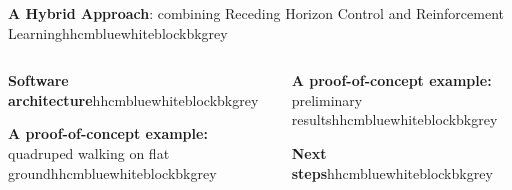 \documentclass{beamer}
\begin{document}
	
	\begin{frame}[t]
		
			
		\begin{columns}[b]
			
			\begin{column}{0.955\textwidth}
				
				\begin{customblock}{\textbf{A Hybrid Approach}: combining Receding Horizon Control and Reinforcement Learning}{hhcmblue}{white}{blockbkgrey}
					
					
					
				\end{customblock}
		
			\end{column}
		
		\end{columns}
			
		\begin{columns}[T] 

			\begin{column}{.46\textwidth}
				
				\begin{customblock}{\textbf{Software architecture}}{hhcmblue}{white}{blockbkgrey}
					
				\end{customblock}
				\begin{customblock}{\textbf{A proof-of-concept example:} quadruped walking on flat ground}{hhcmblue}{white}{blockbkgrey}
					
				\end{customblock}
				
			\end{column}
			
			\begin{column}{.46\textwidth}
			
				\begin{customblock}{\textbf{A proof-of-concept example: } preliminary results}{hhcmblue}{white}{blockbkgrey}
					
				\end{customblock}
			
				
				\begin{customblock}{\textbf{Next steps}}{hhcmblue}{white}{blockbkgrey}
					
				\end{customblock}
			

\end{column}
\end{columns}
\end{frame}
\end{document}
